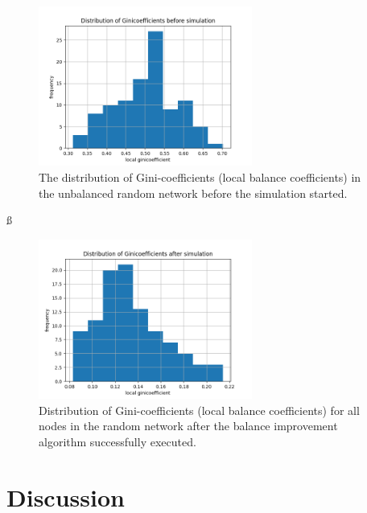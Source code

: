 \documentclass[a4paper]{paper}
\begin{document}
\begin{figure}
 \centering
 \includegraphics[width=7cm]{code/results/routabilityTest/1574847007_ginicoefficients_start.png}
 \caption{The distribution of Gini-coefficients (local balance coefficients) in the unbalanced random network before the simulation started.}
 \label{fig:giniStart}
\end{figure}ß
\begin{figure}
 \centering
 \includegraphics[width=7cm]{code/results/routabilityTest/1574847007_ginicoefficients_end.png}
 \caption{Distribution of Gini-coefficients (local balance coefficients) for all nodes in the random network after the balance improvement algorithm successfully executed.}
 \label{fig:giniEnd}
\end{figure}






\section{Discussion}
\label{sec:conclusion}
\end{document}
